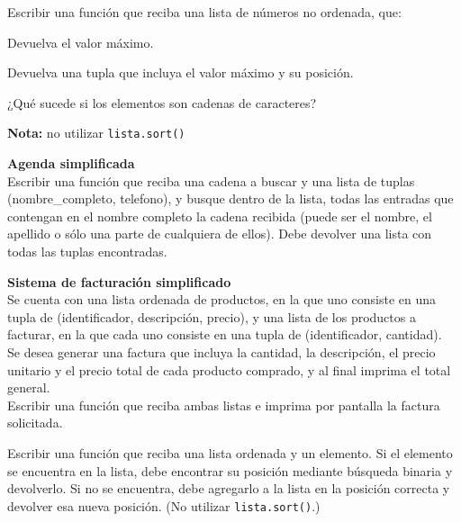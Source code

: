 \begin{ejercicio}
Escribir una función que reciba una lista de números no ordenada, que:
\begin{partes}
\item Devuelva el valor máximo.
\item Devuelva una tupla que incluya el valor máximo y su posición.
\item ¿Qué sucede si los elementos son cadenas de caracteres?
\end{partes}
{\bf Nota:} no utilizar \verb!lista.sort()!
\end{ejercicio}


\begin{ejercicio}
{\bf Agenda simplificada} \\
Escribir una función que reciba una cadena a buscar y una lista de tuplas
(nombre\_completo, telefono), y busque dentro de la lista, todas las
entradas que contengan en el nombre completo la cadena recibida (puede
ser el nombre, el apellido o sólo una parte de cualquiera de ellos).
Debe devolver una lista con todas las tuplas encontradas.
\end{ejercicio}


\begin{ejercicio}
{\bf Sistema de facturación simplificado} \\
Se cuenta con una lista ordenada de productos, en la que uno consiste en
una tupla de (identificador, descripción, precio), y una lista de los
productos a facturar, en la que cada uno consiste en una tupla de
(identificador, cantidad). \\
Se desea generar una factura que incluya la cantidad, la descripción, el
precio unitario y el precio total de cada producto comprado, y al final
imprima el total general. \\
Escribir una función que reciba ambas listas e imprima por
pantalla la factura solicitada.
\end{ejercicio}


\begin{ejercicio}
Escribir una función que reciba una lista ordenada y un elemento. Si el
elemento se encuentra en la lista, debe encontrar su posición mediante
búsqueda binaria y devolverlo.  Si no se encuentra, debe agregarlo a la
lista en la posición correcta y devolver esa nueva posición. (No utilizar
\verb!lista.sort()!.)
\end{ejercicio}

